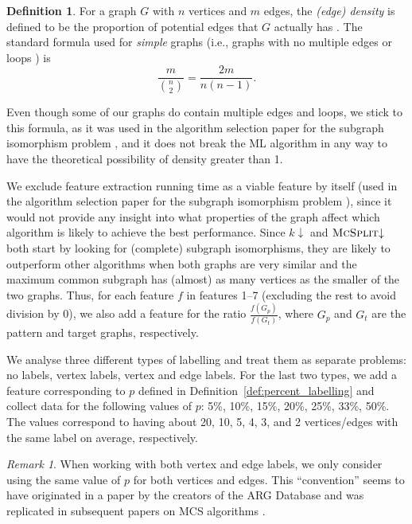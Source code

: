 \documentclass{l4proj}
\theoremstyle{definition}
\newtheorem{definition}{Definition}[chapter]
\theoremstyle{remark}
\newtheorem{remark}{Remark}[chapter]
\begin{document}
\begin{definition}
For a graph $G$ with $n$ vertices and $m$ edges, the \emph{(edge) density} is
defined to be the proportion of potential edges that $G$ actually has
\cite{DBLP:books/daglib/0030488}. The standard formula used for \emph{simple}
graphs (i.e., graphs with no multiple edges or loops
\cite{DBLP:books/ws/NishizekiR04}) is
\[ \frac{m}{\binom{n}{2}} = \frac{2m}{n(n-1)}. \]
\end{definition}
Even though some of our graphs do contain multiple edges and loops, we stick to
this formula, as it was used in the algorithm selection paper for the subgraph
isomorphism problem \cite{DBLP:conf/lion/KotthoffMS16}, and it does
not break the ML algorithm in any way to have the theoretical possibility of
density greater than 1.

We exclude feature extraction running time as a viable feature by itself (used
in the algorithm selection paper for the subgraph isomorphism problem
\cite{DBLP:conf/lion/KotthoffMS16}), since it would not provide any insight into
what properties of the graph affect which algorithm is likely to achieve the
best performance. Since $k{\downarrow}$ and $\textsc{McSplit}{\downarrow}$ both
start by looking for (complete) subgraph isomorphisms, they are likely to
outperform other algorithms when both graphs are very similar and the maximum
common subgraph has (almost) as many vertices as the smaller of the two graphs.
Thus, for each feature $f$ in features 1--7 (excluding the rest to avoid
division by 0), we also add a feature for the ratio $\frac{f(G_p)}{f(G_t)}$,
where $G_p$ and $G_t$ are the pattern and target graphs, respectively.

We analyse three different types of labelling and treat them as separate
problems: no labels, vertex labels, vertex and edge labels. For the last two
types, we add a feature corresponding to $p$ defined in
Definition~\ref{def:percent_labelling} and collect data for the following values
of $p$: 5\%, 10\%, 15\%, 20\%, 25\%, 33\%, 50\%. The values correspond to having
about 20, 10, 5, 4, 3, and 2 vertices/edges with the same label on average,
respectively.

\begin{remark}
  When working with both vertex and edge labels, we only consider using the same
  value of $p$ for both vertices and edges. This ``convention'' seems to have
  originated in a paper by the creators of the ARG Database
  \cite{DBLP:journals/jgaa/ConteFV07} and was replicated in subsequent papers on
  MCS algorithms \cite{DBLP:conf/cp/McCreeshNPS16, DBLP:conf/cp/NdiayeS11}.
\end{remark}
\end{document}
